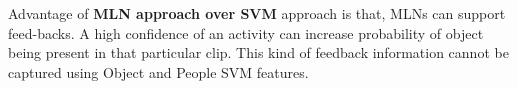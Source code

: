 \begin{comment}
\begin{table}[t,here]
\centering
\captionsetup{justification=centering,margin=2cm}
\begin{tabular}{| l | c | c |}
\hline
	{\bf Activity Class}
	& \multicolumn{1}{p{3cm}|}{\centering {\bf AP - Basic \\ SVM}}
	& \multicolumn{1}{p{3cm}|}{\centering {\bf AP - Object \\ and People} }\\ \hline
AnswerPhone & 11.36\% & 16.67\% \\ \hline
DriveCar & 66.96\% & 70.09\% \\ \hline
Eat & 45.45\% & 50.00\% \\ \hline
FightPerson & 57.63\% & 66.04\% \\ \hline
GetOutCar & 17.86\% & 12.12\% \\ \hline
HandShake & 25.93\% & 31.82\% \\ \hline
HugPerson & 15.15\% & 17.86\% \\ \hline
Kiss & 18.18\% & 20.69\% \\ \hline
Run & 38.78\% & 39.35\% \\ \hline
SitDown & 40.96\% & 42.05\% \\ \hline
SitUp & 5.26\% & 8.70\% \\ \hline
StandUp & 35.20\% & 37.88\%\\ \hline
Average AP & 31.56\% & 34.44\% \\ \hline
%
\end{tabular}
\caption{Average Precision : Object and People Features in SVM}
\label{table:SVM_TFIDF}
\end{table}
\end{comment}

Advantage of {\bf MLN approach over SVM} approach is that, MLNs can support feed-backs.
A high confidence of an activity can increase probability of object being present in that particular clip. 
This kind of feedback information cannot be captured using Object and People SVM features.

